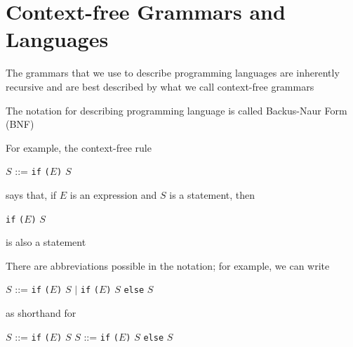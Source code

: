 \documentclass[8pt,a4paper,compress]{beamer}
\newcommand{\mm}[1]{$#1$}
\begin{document}
\section{Context-free Grammars and Languages}
\begin{frame}[fragile]
\pause

The grammars that we use to describe programming languages are inherently recursive and are best described by what we call context-free grammars

\pause
\bigskip

The notation for describing programming language is called Backus-Naur Form (BNF)

\pause
\bigskip

For example, the context-free rule

\begin{production}
\mm{S} ::=  \lstinline{if} \lstinline{(}\mm{E}\lstinline{)} \mm{S}
\end{production}

\noindent says that, if \mm{E} is an expression and \mm{S} is a statement, then 

\begin{production}
\lstinline{if} \lstinline{(}\mm{E}\lstinline{)} \mm{S}
\end{production}

\noindent is also a statement

\pause
\bigskip

There are abbreviations possible in the notation; for example, we can write

\begin{production}
\mm{S} ::= \lstinline{if} \lstinline{(}\mm{E}\lstinline{)} \mm{S}
      \mm{|} \lstinline{if} \lstinline{(}\mm{E}\lstinline{)} \mm{S} \lstinline{else} \mm{S}
\end{production}

\noindent as shorthand for

\begin{production}
\mm{S} ::= \lstinline{if} \lstinline{(}\mm{E}\lstinline{)} \mm{S}
\mm{S} ::= \lstinline{if} \lstinline{(}\mm{E}\lstinline{)} \mm{S} \lstinline{else} \mm{S}
\end{production}
\end{frame}
\end{document}
